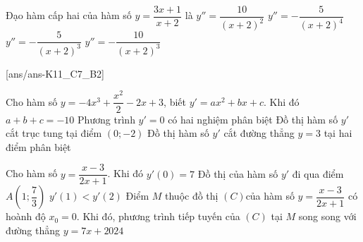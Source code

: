 	\begin{ex}%
		Đạo hàm cấp hai của hàm số $ y=\dfrac{3x+1}{x+2}$ là
		\choice
		{$y''=\dfrac{10}{\left(x+2\right)^2}$}
		{$y''=-\dfrac{5}{\left(x+2\right)^4}$}
		{$y''=-\dfrac{5}{\left(x+2\right)^3}$}
		{\True $y''=-\dfrac{10}{\left(x+2\right)^3}$}
	\end{ex}



\cauds
{}[ans/ans-K11_C7_B2]

\begin{ex}%
	Cho hàm số $y=-4 x^3+\dfrac{x^2}{2}-2 x+3$, biết $ y'=a{x^2}+bx+c$. Khi đó
	\choiceTF
	{$ a+b+c=-10$}
	{Phương trình $ y'=0$ có hai nghiệm phân biệt}
	{\True Đồ thị hàm số $ y'$ cắt trục tung tại điểm $\left(0;-2\right)$}
	{Đồ thị hàm số $ y'$ cắt đường thẳng $ y=3$ tại hai điểm phân biệt}
\end{ex}

\begin{ex}%
Cho hàm số $y=\dfrac{x-3}{2 x+1}$. Khi đó
\choiceTF
{\True $ y'(0)=7$}
{Đồ thị của hàm số $ y'$ đi qua điểm $ A\left(1;\dfrac{7}{3}\right)$}
{$ y'(1)<y'(2)$}
{\True Điểm $ M$ thuộc đồ thị $(C)$của hàm số $y=\dfrac{x-3}{2 x+1}$ có hoành độ $x_0=0$. Khi đó, phương trình tiếp tuyến của $(C)$ tại $M$ song song với đường thẳng $ y=7x+2024$}
\end{ex}

